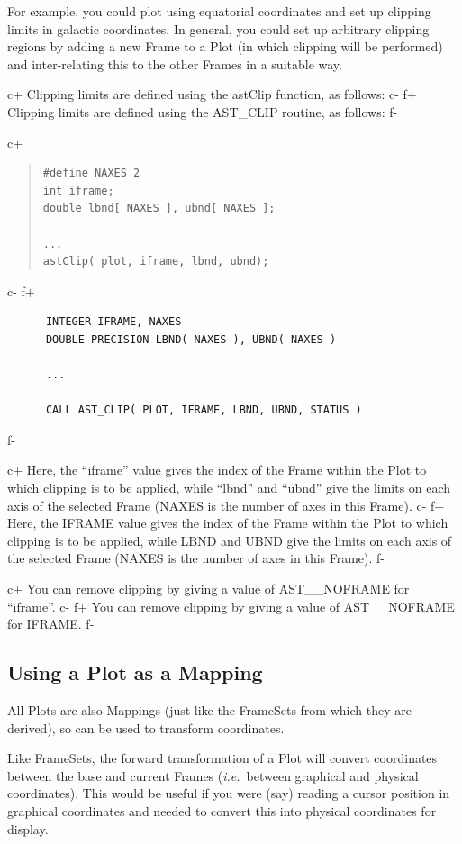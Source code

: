 \documentclass[twoside,11pt]{article}
\begin{document}
For example, you could plot using equatorial coordinates and set up
clipping limits in galactic coordinates. In general, you could set up
arbitrary clipping regions by adding a new Frame to a Plot (in which
clipping will be performed) and inter-relating this to the other
Frames in a suitable way.

c+
Clipping limits are defined using the astClip function, as follows:
c-
f+
Clipping limits are defined using the AST\_CLIP routine, as follows:
f-

c+
\begin{quote}
\small
\begin{verbatim}
#define NAXES 2
int iframe;
double lbnd[ NAXES ], ubnd[ NAXES ];

...
astClip( plot, iframe, lbnd, ubnd);
\end{verbatim}
\normalsize
\end{quote}
c-
f+
\small
\begin{verbatim}
      INTEGER IFRAME, NAXES
      DOUBLE PRECISION LBND( NAXES ), UBND( NAXES )

      ...

      CALL AST_CLIP( PLOT, IFRAME, LBND, UBND, STATUS )
\end{verbatim}
\normalsize
f-

c+
Here, the ``iframe'' value gives the index of the Frame within the
Plot to which clipping is to be applied, while ``lbnd'' and ``ubnd''
give the limits on each axis of the selected Frame (NAXES is the
number of axes in this Frame).
c-
f+
Here, the IFRAME value gives the index of the Frame within the Plot to
which clipping is to be applied, while LBND and UBND give the limits
on each axis of the selected Frame (NAXES is the number of axes in
this Frame).
f-

c+
You can remove clipping by giving a value of AST\_\_NOFRAME for ``iframe''.
c-
f+
You can remove clipping by giving a value of AST\_\_NOFRAME for IFRAME.
f-

\subsection{Using a Plot as a Mapping}

All Plots are also Mappings (just like the FrameSets from which they
are derived), so can be used to transform coordinates.

Like FrameSets, the forward transformation of a Plot will convert
coordinates between the base and current Frames ({\em{i.e.}}\ between
graphical and physical coordinates). This would be useful if you were
(say) reading a cursor position in graphical coordinates and needed to
convert this into physical coordinates for display.
\end{document}
